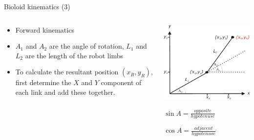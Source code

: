 \documentclass[compress]{beamer}
\begin{document}
\begin{frame}{Bioloid kinematics (3)}

    \begin{columns}
        \begin{column}{0.5\linewidth}
    \begin{itemize}

        \item Forward kinematics
        \item $A_1$ and $A_2$ are the angle of rotation, $L_1$ and
            $L_2$ are the length of the robot limbs
        \item To calculate the resultant position $(x_R, y_R)$, first
            determine the $X$ and $Y$ component of each link and add these together.
    \end{itemize}
            
        \end{column}
        \begin{column}{0.5\linewidth}

            \begin{center}
                \includegraphics[width=\linewidth]{image32}
            \end{center}

            $\sin A = \frac{opposite}{hypotenuse}$

            $\cos A = \frac{adjacent}{hypotenuse}$

        \end{column}
    \end{columns}


\end{frame}
\end{document}
